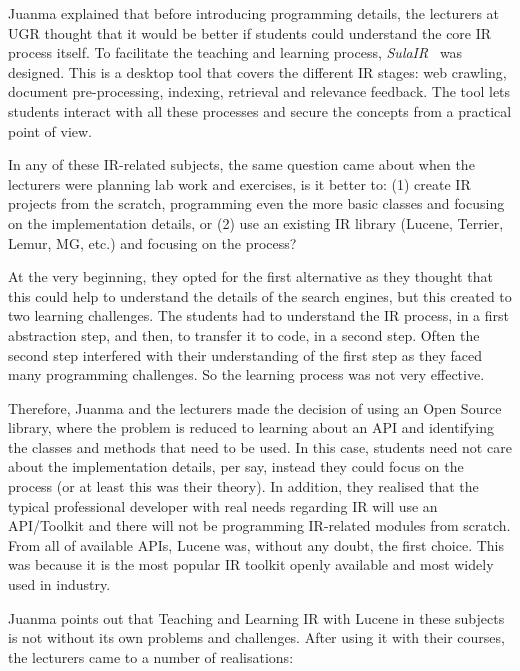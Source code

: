 Juanma explained that before introducing programming details, the lecturers at UGR thought that it would be better if  students could understand the core IR process itself. To facilitate the teaching and learning process, {\it SulaIR}~\cite{Fernandez2010} was designed. This is a desktop tool that covers the different IR stages: web crawling, document pre-processing,  indexing, retrieval and relevance feedback. The tool lets students interact with all these processes and secure the concepts from a practical point of view. 

In any of these IR-related subjects, the same question came about when the lecturers were planning 
lab work and exercises, is it better to: (1) create IR projects from the scratch, programming even the more basic classes and focusing on the implementation details, or (2) use an existing IR library (Lucene, Terrier, Lemur, MG, etc.) and focusing on the process?

At the very beginning, they opted for the first alternative as they thought that this could help to understand the details of the search engines, but this created to two learning challenges. The students had to understand the IR process, in a first abstraction step,  and then, to transfer it to code, in a second step. Often the second step interfered with their understanding of the first step as they faced many programming challenges. So the learning process was not very effective.

Therefore, Juanma and the lecturers made the decision of using an Open Source library, where the problem is reduced to learning about an API and identifying the classes and methods that need to be used. In this case, students need not care about the implementation details, per say, instead they could focus on the process (or at least this was their theory). In addition, they realised that the typical professional developer with real needs regarding IR will use an API/Toolkit and there will not be programming IR-related modules from scratch. From all of available APIs, Lucene was, without any doubt, the first choice. This was because it is the most popular IR toolkit openly available and most widely used in industry.

Juanma points out that Teaching and Learning IR with Lucene in these subjects is not without its own problems and challenges. After using it with their courses, the lecturers came to a number of realisations:

